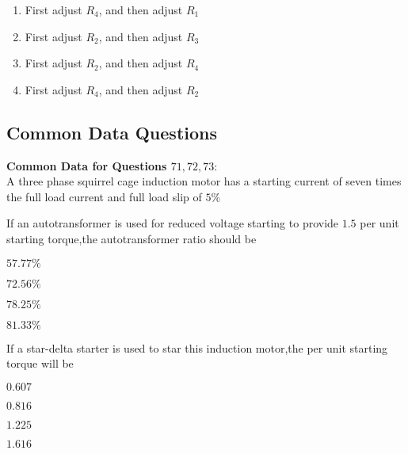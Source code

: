         \begin{enumerate}    
                \item First adjust $R_4$, and then adjust $R_1$
                \item First adjust $R_2$, and then adjust $R_3$
                \item First adjust $R_2$, and then adjust $R_4$
                \item First adjust $R_4$, and then adjust $R_2$
       \end{enumerate}
\subsection{Common Data Questions}
\textbf{Common Data for Questions $71,72,73:$} \\
A three phase squirrel cage induction motor has a starting current of seven times the full load current and full load slip of $5\%$

    \item [71.] If an autotransformer is used for reduced voltage starting to provide $1.5$ per unit starting torque,the autotransformer ratio \brak{\%} should be
        \begin{enumerate}    
        \begin{multicols}{4}
                \item $57.77\%$
                \item $72.56\%$
                \item $78.25\%$
                \item $81.33\%$
                \end{multicols}
       \end{enumerate}
    \item  [72.] If a star-delta starter is used to star this induction motor,the per unit starting torque will be
        \begin{enumerate}
        \begin{multicols}{4}
                \item $0.607$ 
                \item $0.816$ 
                \item $1.225$ 
                \item $1.616$ 
                \end{multicols}
               \end{enumerate}

